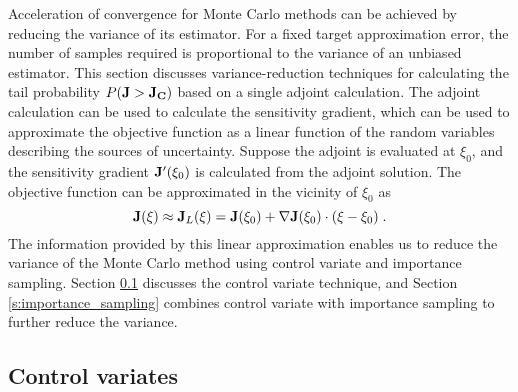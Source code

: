 Acceleration of convergence for Monte Carlo methods can be achieved by
reducing the variance of its estimator.  For a fixed target approximation
error, the number of samples required is proportional to the variance
of an unbiased estimator.  This section discusses variance-reduction
techniques for calculating the tail probability $P({\bf J} > {\bf J_C})$
based on a single adjoint calculation.  The adjoint calculation can be
used to calculate the sensitivity gradient, which can be used to
approximate the objective function as a linear function of the
random variables describing the sources of uncertainty.  Suppose
the adjoint is evaluated at $\xi_0$, and the sensitivity gradient
${\bf J}'(\xi_0)$ is calculated from the adjoint solution.
The objective function can be approximated in the vicinity of $\xi_0$ as
\[ {\bf J}(\xi) \approx {\bf J}_L(\xi)
 = {\bf J}(\xi_0) + \nabla {\bf J}(\xi_0) \cdot (\xi - \xi_0) \;.\]
The information
provided by this linear approximation enables us to reduce the variance
of the Monte Carlo method using control variate and importance sampling.
Section \ref{s:control_variate} discusses the control variate technique, and
Section \ref{s:importance_sampling} combines
control variate with importance sampling to further reduce the variance.

\subsection{Control variates} \label{s:control_variate}

